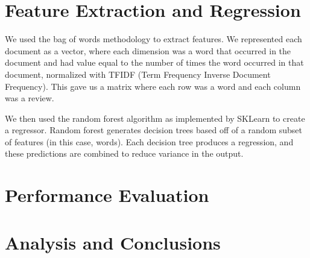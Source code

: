 \documentclass[twocolumn]{article}
\begin{document}
\section{Feature Extraction and Regression}

We used the bag of words methodology to extract features. We represented each document as a vector, where each dimension was a word that occurred in the document and had value equal to the number of times the word occurred in that document, normalized with TFIDF (Term Frequency Inverse Document Frequency). This gave us a matrix where each row was a word and each column was a review.

We then used the random forest algorithm as implemented by SKLearn to create a regressor. Random forest generates decision trees based off of a random subset of features (in this case, words). Each decision tree produces a regression, and these predictions are combined to reduce variance in the output. 

\section{Performance Evaluation}

\section{Analysis and Conclusions}
\end{document}
